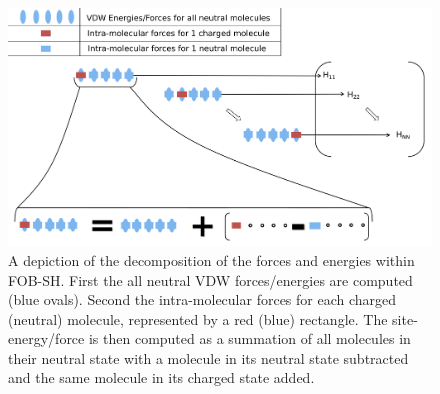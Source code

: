 \begin{figure}[ht]
  \includegraphics[width=\textwidth]{../img/ES/ForceEnerDecomp.png}
  \caption{\label{fig:enerF_decomp}A depiction of the decomposition of the forces and energies within FOB-SH. First the all neutral VDW forces/energies are computed (blue ovals). Second the intra-molecular forces for each charged (neutral) molecule, represented by a red (blue) rectangle. The site-energy/force is then computed as a summation of all molecules in their neutral state with a molecule in its neutral state subtracted and the same molecule in its charged state added.} 
\end{figure}
\\
